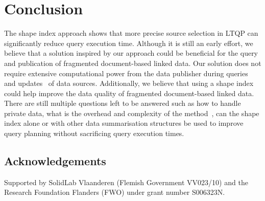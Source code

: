 \section{Conclusion}



The shape index approach shows that more precise source selection in LTQP can significantly reduce query execution time.
Although it is still an early effort, we believe that a solution inspired by our approach could be beneficial for the query and publication of fragmented document-based linked data.
Our solution does not require extensive computational power from the data publisher during queries and updates~ of data sources.
Additionally, we believe that using a shape index could help improve the data quality of fragmented document-based linked data.
There are still multiple questions left to be answered such as how to handle private data, what is the overhead and complexity of the method~,
can the shape index alone or with other data summarisation structures be used to improve query planning without sacrificing query execution times.

\subsection*{Acknowledgements}
Supported by SolidLab Vlaanderen (Flemish Government VV023/10) and the Research Foundation Flanders (FWO) under grant number S006323N.
